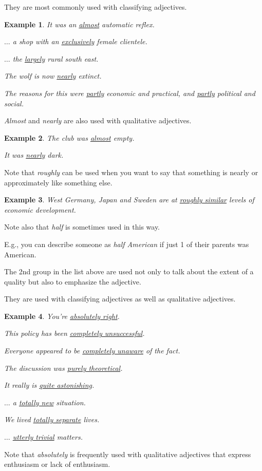 \documentclass[oneside]{book}
\numberwithin{equation}{section}
\newtheorem{example}{Example}[section]
\begin{document}
They are most commonly used with classifying adjectives.
\begin{example}
    It was an \underline{almost} automatic reflex.
    
    $\ldots$ a shop with an \underline{exclusively} female clientele.
    
    $\ldots$ the \underline{largely} rural south east.
    
    The wolf is now \underline{nearly} extinct.
    
    The reasons for this were \underline{partly} economic and practical, and \underline{partly} political and social.
\end{example}
\textit{Almost} and \textit{nearly} are also used with qualitative adjectives.
\begin{example}
    The club was \underline{almost} empty.
    
    It was \underline{nearly} dark.
\end{example}
Note that \textit{roughly} can be used when you want to say that something is nearly or approximately like something else.
\begin{example}
    West Germany, Japan and Sweden are at \underline{roughly similar} levels of economic development.
\end{example}
Note also that \textit{half} is sometimes used in this way.

E.g., you can describe someone as \textit{half American} if just 1 of their parents was American.

%
\noindent{} The 2nd group in the list above are used not only to talk about the extent of a quality but also to emphasize the adjective.

They are used with classifying adjectives as well as qualitative adjectives.
\begin{example}
    You're \underline{absolutely right}.
    
    This policy has been \underline{completely unsuccessful}.
    
    Everyone appeared to be \underline{completely unaware} of the fact.
    
    The discussion was \underline{purely theoretical}.
    
    It really is \underline{quite astonishing}.
    
    $\ldots$ a \underline{totally new} situation.
    
    We lived \underline{totally separate} lives.
    
    $\ldots$ \underline{utterly trivial} matters.
\end{example}
Note that \textit{absolutely} is frequently used with qualitative adjectives that express enthusiasm or lack of enthusiasm.
\end{document}
